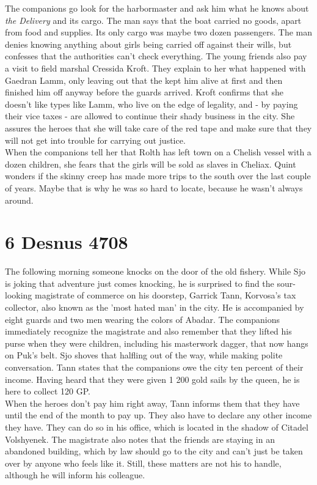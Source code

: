 The companions go look for the harbormaster and ask him what he knows about {\itshape the Delivery} and its cargo. The man says that the boat carried no goods, apart from food and supplies. Its only cargo was maybe two dozen passengers. The man denies knowing anything about girls being carried off against their wills, but confesses that the authorities can't check everything. The young friends also pay a visit to field marshal Cressida Kroft. They explain to her what happened with Gaedran Lamm, only leaving out that the kept him alive at first and then finished him off anyway before the guards arrived. Kroft confirms that she doesn't like types like Lamm, who live on the edge of legality, and - by paying their vice taxes - are allowed to continue their shady business in the city. She assures the heroes that she will take care of the red tape and make sure that they will not get into trouble for carrying out justice.\\

When the companions tell her that Rolth has left town on a Chelish vessel with a dozen children, she fears that the girls will be sold as slaves in Cheliax. Quint wonders if the skinny creep has made more trips to the south over the last couple of years. Maybe that is why he was so hard to locate, because he wasn't always around.\\

\section{6 Desnus 4708}

The following morning someone knocks on the door of the old fishery. While Sjo is joking that adventure just comes knocking, he is surprised to find the sour-looking magistrate of commerce on his doorstep, Garrick Tann, Korvosa's tax collector, also known as the 'most hated man' in the city. He is accompanied by eight guards and two men wearing the colors of Abadar. The companions immediately recognize the magistrate and also remember that they lifted his purse when they were children, including his masterwork dagger, that now hangs on Puk's belt. Sjo shoves that halfling out of the way, while making polite conversation. Tann states that the companions owe the city ten percent of their income. Having heard that they were given 1 200 gold sails by the queen, he is here to collect 120 GP.\\

When the heroes don't pay him right away, Tann informs them that they have until the end of the month to pay up. They also have to declare any other income they have. They can do so in his office, which is located in the shadow of Citadel Volshyenek. The magistrate also notes that the friends are staying in an abandoned building, which by law should go to the city and can't just be taken over by anyone who feels like it. Still, these matters are not his to handle, although he will inform his colleague.\\

